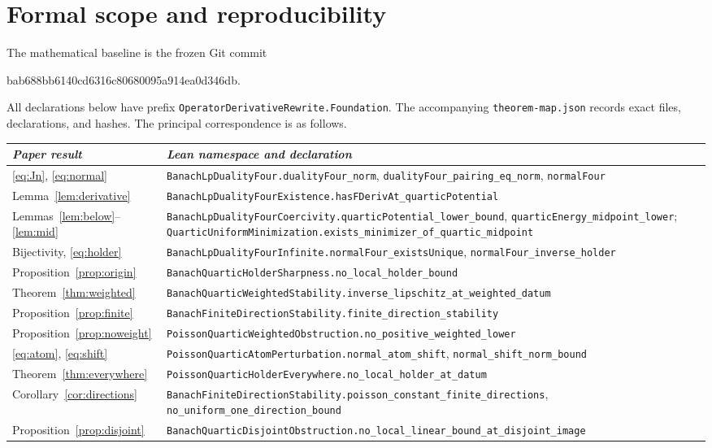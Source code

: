 \documentclass[11pt]{article}
\theoremstyle{remark}\newtheorem{remark}[theorem]{Remark}
\newcommand{\code}[1]{{\small\nolinkurl{#1}}}
\begin{document}
\section{Formal scope and reproducibility}\label{sec:formal}
The mathematical baseline is the frozen Git commit
\begin{center}\small\ttfamily
bab688bb6140cd6316c80680095a914ea0d346db.
\end{center}
All declarations below have prefix
\code{OperatorDerivativeRewrite.Foundation}. The accompanying
\code{theorem-map.json} records exact files, declarations, and hashes.
The principal correspondence is as follows.

\begin{longtable}{@{}p{}p{}@{}}
\textit{Paper result}&\textit{Lean namespace and declaration}\\\hline
\eqref{eq:Jn}, \eqref{eq:normal}&
\code{BanachLpDualityFour.dualityFour_norm},
\code{dualityFour_pairing_eq_norm}, \code{normalFour}\\[3pt]
Lemma~\ref{lem:derivative}&
\code{BanachLpDualityFourExistence.hasFDerivAt_quarticPotential}\\[3pt]
Lemmas~\ref{lem:below}--\ref{lem:mid}&
\code{BanachLpDualityFourCoercivity.quarticPotential_lower_bound},
\code{quarticEnergy_midpoint_lower};
\code{QuarticUniformMinimization.exists_minimizer_of_quartic_midpoint}\\[3pt]
Bijectivity, \eqref{eq:holder}&
\code{BanachLpDualityFourInfinite.normalFour_existsUnique},
\code{normalFour_inverse_holder}\\[3pt]
Proposition~\ref{prop:origin}&
\code{BanachQuarticHolderSharpness.no_local_holder_bound}\\[3pt]
Theorem~\ref{thm:weighted}&
\code{BanachQuarticWeightedStability.inverse_lipschitz_at_weighted_datum}\\[3pt]
Proposition~\ref{prop:finite}&
\code{BanachFiniteDirectionStability.finite_direction_stability}\\[3pt]
Proposition~\ref{prop:noweight}&
\code{PoissonQuarticWeightedObstruction.no_positive_weighted_lower}\\[3pt]
\eqref{eq:atom}, \eqref{eq:shift}&
\code{PoissonQuarticAtomPerturbation.normal_atom_shift},
\code{normal_shift_norm_bound}\\[3pt]
Theorem~\ref{thm:everywhere}&
\code{PoissonQuarticHolderEverywhere.no_local_holder_at_datum}\\[3pt]
Corollary~\ref{cor:directions}&
\code{BanachFiniteDirectionStability.poisson_constant_finite_directions},
\code{no_uniform_one_direction_bound}\\[3pt]
Proposition~\ref{prop:disjoint}&
\code{BanachQuarticDisjointObstruction.no_local_linear_bound_at_disjoint_image}\\
\end{longtable}
\end{document}
